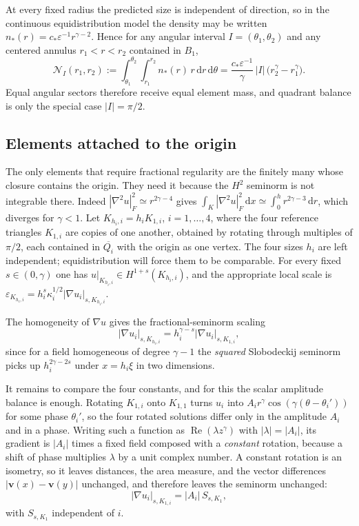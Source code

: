 \documentclass[10pt,pdftex]{amsart}%
\numberwithin{equation}{section}
\newcommand{\dd}{\,\mathrm{d}}
\newcommand{\Ncal}{\mathcal{N}}
\begin{document}
At every fixed radius the predicted size is independent of direction, so in the continuous equidistribution model the density may be written $n_*(r)=c_*\varepsilon^{-1}r^{\gamma-2}$.  Hence for any angular interval $I=(\theta_1,\theta_2)$ and any centered annulus $r_1<r<r_2$ contained in $B_1$,
\begin{equation}\label{eq:annular-balance}
  \Ncal_I(r_1,r_2):=\int_{\theta_1}^{\theta_2}\!\!\int_{r_1}^{r_2}n_*(r)\,r\dd r\dd\theta
  =\frac{c_*\varepsilon^{-1}}{\gamma}\,|I|\,\bigl(r_2^\gamma-r_1^\gamma\bigr).
\end{equation}
Equal angular sectors therefore receive equal element mass, and quadrant balance is only the special case $|I|=\pi/2$.


\subsection{Elements attached to the origin}

The only elements that require fractional regularity are the finitely many whose closure contains the origin.  They need it because the $H^2$ seminorm is not integrable there.  Indeed $|\nabla^2u|_F^2\simeq r^{2\gamma-4}$ gives $\int_K|\nabla^2u|_F^2\dd x\simeq\int_0^{h}r^{2\gamma-3}\dd r$, which diverges for $\gamma<1$.  Let $K_{h_i,i}=h_iK_{1,i}$, $i=1,\ldots,4$, where the four reference triangles $K_{1,i}$ are copies of one another, obtained by rotating through multiples of $\pi/2$, each contained in $\overline{Q_i}$ with the origin as one vertex.  The four sizes $h_i$ are left independent; equidistribution will force them to be comparable.  For every fixed $s\in(0,\gamma)$ one has $u|_{K_{h_i,i}}\in H^{1+s}(K_{h_i,i})$, and the appropriate local scale is $\varepsilon_{K_{h_i,i}}=h_i^s\kappa_i^{1/2}|\nabla u_i|_{s,K_{h_i,i}}$.

The homogeneity of $\nabla u$ gives the fractional-seminorm scaling
\begin{equation}\label{eq:fractional-scale}
 |\nabla u_i|_{s,K_{h_i,i}}
 =h_i^{\gamma-s}|\nabla u_i|_{s,K_{1,i}},
\end{equation}
since for a field homogeneous of degree $\gamma-1$ the \emph{squared} Slobodeckij seminorm picks up $h_i^{2\gamma-2s}$ under $x=h_i\xi$ in two dimensions.

It remains to compare the four constants, and for this the scalar amplitude balance is enough.  Rotating $K_{1,i}$ onto $K_{1,1}$ turns $u_i$ into $A_ir^\gamma\cos(\gamma(\theta-\theta_i'))$ for some phase $\theta_i'$, so the four rotated solutions differ only in the amplitude $A_i$ and in a phase. Writing such a function as $\operatorname{Re}(\lambda z^\gamma)$ with $|\lambda|=|A_i|$, its gradient is $|A_i|$ times a fixed field composed with a \emph{constant} rotation, because a shift of phase multiplies $\lambda$ by a unit complex number.  A constant rotation is an isometry, so it leaves distances, the area measure, and the vector differences $|\mathbf v(x)-\mathbf v(y)|$ unchanged, and therefore leaves the seminorm unchanged:
\begin{equation}\label{eq:fractional-amplitude}
  |\nabla u_i|_{s,K_{1,i}}=|A_i|\,S_{s,K_1},
\end{equation}
with $S_{s,K_1}$ independent of $i$.
\end{document}
